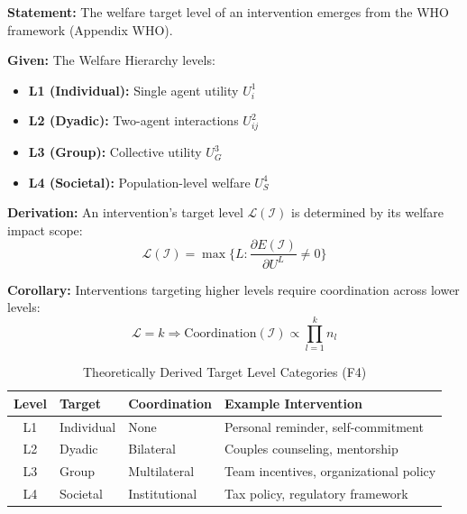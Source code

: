 \begin{tcolorbox}[colback=blue!5!white, colframe=blue!75!black,
    title=\textbf{Theorem HHH-T3: Target Level Emergence from WHO}]

\textbf{Statement:} The welfare target level of an intervention emerges from the WHO framework (Appendix WHO).

\textbf{Given:} The Welfare Hierarchy levels:
\begin{itemize}[nosep]
    \item \textbf{L1 (Individual):} Single agent utility $U^1_i$
    \item \textbf{L2 (Dyadic):} Two-agent interactions $U^2_{ij}$
    \item \textbf{L3 (Group):} Collective utility $U^3_G$
    \item \textbf{L4 (Societal):} Population-level welfare $U^4_S$
\end{itemize}

\textbf{Derivation:} An intervention's target level $\mathcal{L}(\mathcal{I})$ is determined by its welfare impact scope:
\begin{equation}
\mathcal{L}(\mathcal{I}) = \max\{ L : \frac{\partial E(\mathcal{I})}{\partial U^L} \neq 0 \}
\label{eq:hhh-level-mapping}
\end{equation}

\textbf{Corollary:} Interventions targeting higher levels require coordination across lower levels:
\begin{equation}
\mathcal{L} = k \Rightarrow \text{Coordination}(\mathcal{I}) \propto \prod_{l=1}^{k} n_l
\end{equation}

\end{tcolorbox}

\begin{table}[htbp]
\centering
\caption{Theoretically Derived Target Level Categories (F4)}
\label{tab:hhh-level-derived}
\renewcommand{\arraystretch}{1.3}
\begin{tabular}{@{}cllp{4.5cm}@{}}
\toprule
\textbf{Level} & \textbf{Target} & \textbf{Coordination} & \textbf{Example Intervention} \\
\midrule
L1 & Individual & None & Personal reminder, self-commitment \\
L2 & Dyadic & Bilateral & Couples counseling, mentorship \\
L3 & Group & Multilateral & Team incentives, organizational policy \\
L4 & Societal & Institutional & Tax policy, regulatory framework \\
\bottomrule
\end{tabular}
\end{table}


